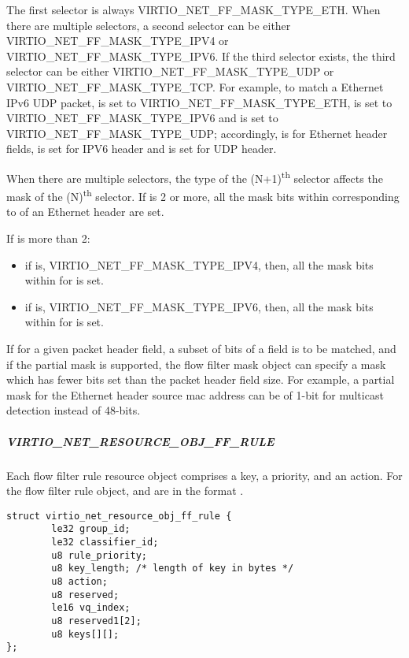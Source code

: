 The first selector is always VIRTIO_NET_FF_MASK_TYPE_ETH. When there are multiple
selectors, a second selector can be either VIRTIO_NET_FF_MASK_TYPE_IPV4
or VIRTIO_NET_FF_MASK_TYPE_IPV6. If the third selector exists, the third
selector can be either VIRTIO_NET_FF_MASK_TYPE_UDP or VIRTIO_NET_FF_MASK_TYPE_TCP.
For example, to match a Ethernet IPv6 UDP packet,
 is set to VIRTIO_NET_FF_MASK_TYPE_ETH, 
is set to VIRTIO_NET_FF_MASK_TYPE_IPV6 and  is
set to VIRTIO_NET_FF_MASK_TYPE_UDP; accordingly,  is
for Ethernet header fields,  is set for IPV6 header
and  is set for UDP header.

When there are multiple selectors, the type of the (N+1)\textsuperscript{th} selector
affects the mask of the (N)\textsuperscript{th} selector. If
 is 2 or more, all the mask bits within 
corresponding to  of an Ethernet header are set.

If  is more than 2:
\begin{itemize}
\item if  is, VIRTIO_NET_FF_MASK_TYPE_IPV4, then, all the mask bits within
 for  is set.
\item if  is, VIRTIO_NET_FF_MASK_TYPE_IPV6, then, all the mask bits within
 for  is set.
\end{itemize}

If for a given packet header field, a subset of bits of a field is to be matched,
and if the partial mask is supported, the flow filter
mask object can specify a mask which has fewer bits set than the packet header
field size. For example, a partial mask for the Ethernet header source mac
address can be of 1-bit for multicast detection instead of 48-bits.

\subparagraph{VIRTIO_NET_RESOURCE_OBJ_FF_RULE}\label{par:Device Types / Network Device / Device Operation / Flow filter / Resource objects / VIRTIO-NET-RESOURCE-OBJ-FF-RULE}

Each flow filter rule resource object comprises a key, a priority, and an action.
For the flow filter rule object,
 and
 are in the format
.

\begin{lstlisting}
struct virtio_net_resource_obj_ff_rule {
        le32 group_id;
        le32 classifier_id;
        u8 rule_priority;
        u8 key_length; /* length of key in bytes */
        u8 action;
        u8 reserved;
        le16 vq_index;
        u8 reserved1[2];
        u8 keys[][];
};
\end{lstlisting}

